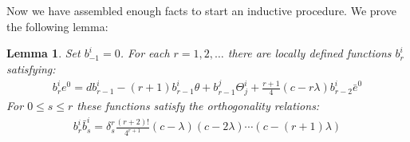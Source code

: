 \documentclass[11pt]{amsart}
\newtheorem{lem}[subsection]{Lemma}
\theoremstyle{definition}
\begin{document}
Now we have assembled enough facts to start an inductive procedure.  We prove the following lemma:

\begin{lem} Set $b^i_{-1} = 0$. For each $r = 1,2, \ldots$ there are locally defined functions $b^i_r$ satisfying:
%
\begin{align}
b^i_r e^0 = d b^i_{r-1} - (r + 1) b^i_{r-1} \theta + b^j_{r-1} \Theta^i_j + \frac{r + 1}{4} (c - r \lambda) b^i_{r-2} \bar{e}^0
\end{align}
%
For $0 \leq s \leq r$ these functions satisfy the orthogonality relations:
%
\begin{align}
b^i_r \bar{b}^i_s = \delta^r_s \frac{(r + 2)!}{4^{r + 1}} (c - \lambda)(c - 2 \lambda) \cdots (c - (r+1) \lambda)
\end{align}
%
\end{lem}
\end{document}
